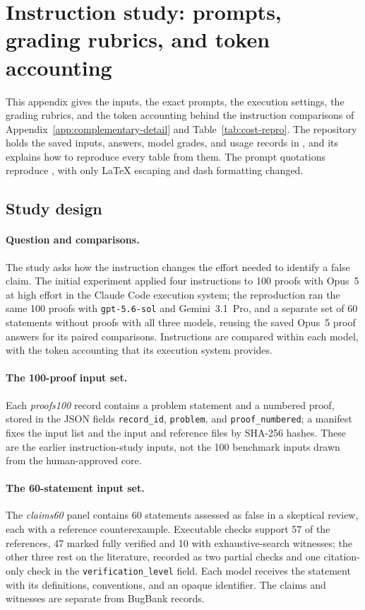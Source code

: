 \section{Instruction study: prompts, grading rubrics, and token accounting}
\label{app:cost-repro-procedures}
This appendix gives the inputs, the exact prompts, the execution settings, the grading rubrics, and the token accounting behind the instruction comparisons of Appendix~\ref{app:complementary-detail} and Table~\ref{tab:cost-repro}. The repository holds the saved inputs, answers, model grades, and usage records in , and its  explains how to reproduce every table from them. The prompt quotations reproduce , with only LaTeX escaping and dash formatting changed.

\subsection{Study design}
\label{app:cost-repro-reproduction}

\paragraph{Question and comparisons.}
The study asks how the instruction changes the effort needed to identify a false claim. The initial experiment applied four instructions to 100 proofs with Opus~5 at high effort in the Claude Code execution system; the reproduction ran the same 100 proofs with \texttt{gpt-5.6-sol} and Gemini~3.1~Pro, and a separate set of 60 statements without proofs with all three models, reusing the saved Opus~5 proof answers for its paired comparisons. Instructions are compared within each model, with the token accounting that its execution system provides.

\paragraph{The 100-proof input set.}
Each \emph{proofs100} record contains a problem statement and a numbered proof, stored in the JSON fields \texttt{record\_id}, \texttt{problem}, and \texttt{proof\_numbered}; a manifest fixes the input list and the input and reference files by SHA-256 hashes. These are the earlier instruction-study inputs, not the 100 benchmark inputs drawn from the human-approved core.

\paragraph{The 60-statement input set.}
The \emph{claims60} panel contains 60 statements assessed as false in a skeptical review, each with a reference counterexample. Executable checks support 57 of the references, 47 marked fully verified and 10 with exhaustive-search witnesses; the other three rest on the literature, recorded as two partial checks and one citation-only check in the \texttt{verification\_level} field. Each model receives the statement with its definitions, conventions, and an opaque identifier. The claims and witnesses are separate from BugBank records.

